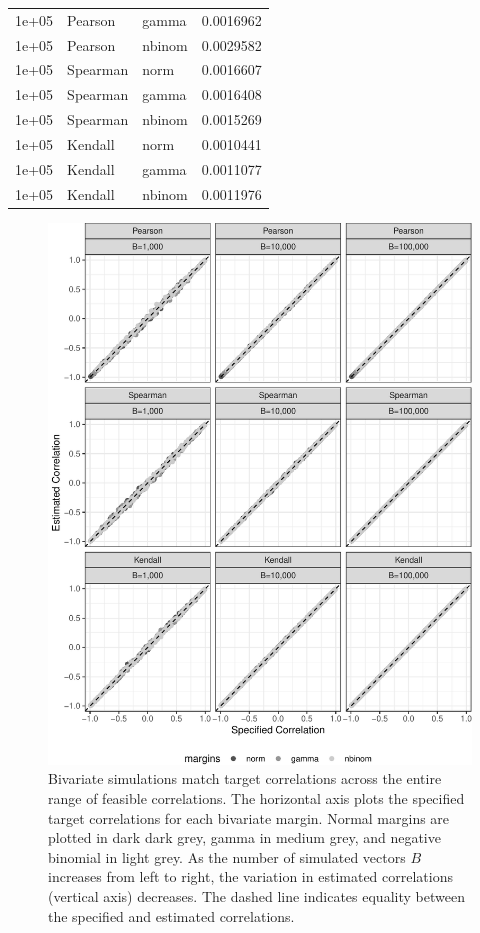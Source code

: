 \documentclass{article}
\begin{document}
\begin{table}
\begin{tabular}[t]{lllr}
1e+05 & Pearson & gamma & 0.0016962\\
1e+05 & Pearson & nbinom & 0.0029582\\
\addlinespace
1e+05 & Spearman & norm & 0.0016607\\
1e+05 & Spearman & gamma & 0.0016408\\
1e+05 & Spearman & nbinom & 0.0015269\\
\addlinespace
1e+05 & Kendall & norm & 0.0010441\\
1e+05 & Kendall & gamma & 0.0011077\\
1e+05 & Kendall & nbinom & 0.0011976\\
\bottomrule
\end{tabular}
\end{table}

\begin{figure}
\centering
\includegraphics{ch040-bPlot-1.pdf}
\caption{\label{fig:ch040-bPlot}Bivariate simulations match target
correlations across the entire range of feasible correlations. The
horizontal axis plots the specified target correlations for each
bivariate margin. Normal margins are plotted in dark dark grey, gamma in
medium grey, and negative binomial in light grey. As the number of
simulated vectors \(B\) increases from left to right, the variation in
estimated correlations (vertical axis) decreases. The dashed line
indicates equality between the specified and estimated correlations.}
\end{figure}
\end{document}
